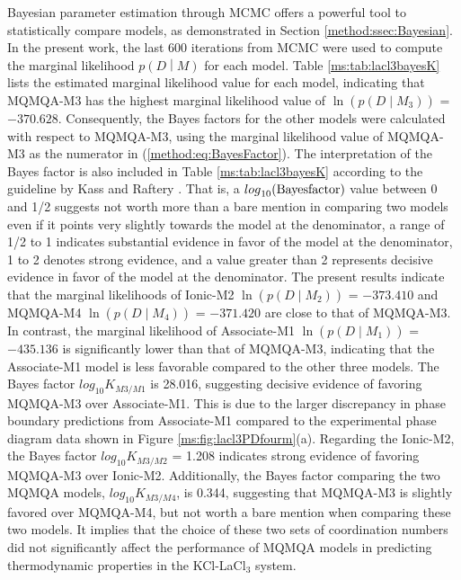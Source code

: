 Bayesian parameter estimation through MCMC offers a powerful tool to statistically compare models, as demonstrated in Section \ref{method:ssec:Bayesian}. In the present work, the last 600 iterations from MCMC were used to compute the marginal likelihood $p\left(D\middle| M\right)$ for each model. Table \ref{ms:tab:lacl3bayesK} lists the estimated marginal likelihood value for each model, indicating that MQMQA-M3 has the highest marginal likelihood value of $\ln(p\left(D\middle| M_3\right))$ = $-370.628$. Consequently, the Bayes factors for the other models were calculated with respect to MQMQA-M3, using the marginal likelihood value of MQMQA-M3 as the numerator in (\ref{method:eq:BayesFactor}). The interpretation of the Bayes factor is also included in Table \ref{ms:tab:lacl3bayesK} according to the guideline by Kass and Raftery \cite{kass1995bayes}. That is, a ${log}_{10}({\rm Bayes factor})$ value between 0 and 1/2 suggests not worth more than a bare mention in comparing two models even if it points very slightly towards the model at the denominator, a range of 1/2 to 1 indicates substantial evidence in favor of the model at the denominator, 1 to 2 denotes strong evidence, and a value greater than 2 represents decisive evidence in favor of the model at the denominator. The present results indicate that the marginal likelihoods of Ionic-M2 $\ln(p\left(D\middle| M_2\right))$ = $-373.410$ and MQMQA-M4 $\ln(p\left(D\middle| M_4\right))$ = $-371.420$ are close to that of MQMQA-M3. In contrast, the marginal likelihood of Associate-M1 $\ln(p\left(D\middle| M_1\right))$ = $-435.136$ is significantly lower than that of MQMQA-M3, indicating that the Associate-M1 model is less favorable compared to the other three models. The Bayes factor ${log}_{10}K_{M3/M1}$ is 28.016, suggesting decisive evidence of favoring MQMQA-M3 over Associate-M1. This is due to the larger discrepancy in phase boundary predictions from Associate-M1 compared to the experimental phase diagram data shown in Figure \ref{ms:fig:lacl3PDfourm}(a). Regarding the Ionic-M2, the Bayes factor ${log}_{10}K_{M3/M2}$ = 1.208 indicates strong evidence of favoring MQMQA-M3 over Ionic-M2. Additionally, the Bayes factor comparing the two MQMQA models, ${log}_{10}K_{M3/M4}$, is 0.344, suggesting that MQMQA-M3 is slightly favored over MQMQA-M4, but not worth a bare mention when comparing these two models. It implies that the choice of these two sets of coordination numbers did not significantly affect the performance of MQMQA models in predicting thermodynamic properties in the KCl-LaCl$_3$ system. 

